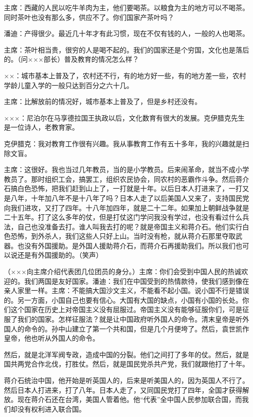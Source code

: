 主席：西藏的人民以吃牛羊肉为主，他们要喝茶。以粮食为主的地方可以不喝茶。同时茶叶也没有那么多，供应不了。你们国家产茶叶吗？

潘迪：产得很少。最近几十年才有此习惯，现在不仅有钱的人，一般的人也喝茶。

主席：茶叶相当贵，很穷的人是喝不起的。我们的国家还是个穷国，文化也是落后的。（问×××部长）普及教育的情况怎么样？

××：城市基本上普及了，农村还不行，有的地方好一些，有的地方差一些，农村学龄儿童入学的一般只达到百分之六十几。

主席：比解放前的情况好，城市基本上普及了，但是乡村还没有。

×××：尼泊尔在马享德拉国王执政以后，文化数育有很大的发展。克伊腊克先生是一位诗人，老教育家。

克伊腊克：我对教育工作很有兴趣。我从事教育工作有五十多年，我的兴趣就是扫除文盲。

主席：这很好。我也当过几年教员，当的是小学教员。后来闹革命，就当不成小学教员了。那时组织工会，搞罢工，组织农民协会，同农村的恶霸作斗争。然后蒋介石搞白色恐怖，把我们赶到山上了，一打就是十年。以后日本人打进来了，一打又是八年，十年加八年不是十八年了吗？日本人走了以后美国人又来了，支持国民党向我们进攻，又打了四年。十八年加四年，就是二十二年。如果加上朝鲜战争就是二十五年。打了这么多年的仗，但是打仗这门学问我没有学过，也没有看过什么兵法，自己也没准备去打。谁人叫我去打的呢？就是帝国主义和蒋介石。他们实行白色恐怖，到外杀人，我们这些人只好上山。当时没有枪，就从蒋介石那里夺取武器。也没有外国援助。是外国人援助蒋介石，而蒋介石再援助我们。所以我们也可以说还是有外国援助的。（笑声）

（×××向主席介绍代表团几位团员的身分。）主席：你们会受到中国人民的热诚欢迎的。我们两国是友好国家。潘迪：我们在中国受到的热情款待，使我们感到像在亲人家里一样。主席：不能搞大国沙文主义，不能看不起小国。说小国不行是错误的。另一方面，小国自己也要有信心。大国有大国的缺点，小国有小国的长处。你们这个国家在历史上对帝国主义没有屈服过。帝国主义没有能够征服你们，可是征服了我们的国家。怎样征服法？就是让中国政府听外国人的命令。清末皇帝是听外国人的命令的。孙中山建立了第一个共和国，但是几个月便垮了。然后，袁世凯作皇帝，他也听从外国人的命令。

然后，就是北洋军阀专政，造成中国的分裂。他们之间打了多年的仗。然后，就是国共两党合作北伐，打胜仗。然后，就是国民党杀共产党，我们就跟他打了十年。

蒋介石统治中国，他开始是听英国人的，后来是听美国人的，因为英国人不行了。然后日本人打进来，打了八年。日本人走了，又同国民党打了四年，全国才获得解放。现在蒋介石还在台湾，美国人管着他。他“代表”全中国人民参加联合国，而我们却没有权利进入联合国。

